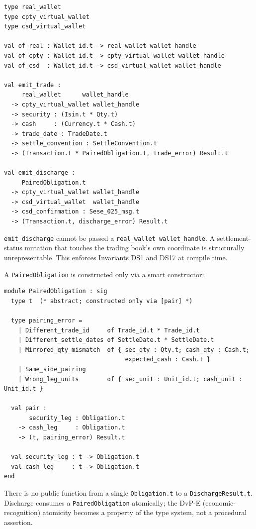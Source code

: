 \documentclass[11pt,a4paper]{article}
\begin{document}
\begin{lstlisting}
type real_wallet
type cpty_virtual_wallet
type csd_virtual_wallet

val of_real : Wallet_id.t -> real_wallet wallet_handle
val of_cpty : Wallet_id.t -> cpty_virtual_wallet wallet_handle
val of_csd  : Wallet_id.t -> csd_virtual_wallet wallet_handle

val emit_trade :
     real_wallet      wallet_handle
  -> cpty_virtual_wallet wallet_handle
  -> security : (Isin.t * Qty.t)
  -> cash     : (Currency.t * Cash.t)
  -> trade_date : TradeDate.t
  -> settle_convention : SettleConvention.t
  -> (Transaction.t * PairedObligation.t, trade_error) Result.t

val emit_discharge :
     PairedObligation.t
  -> cpty_virtual_wallet wallet_handle
  -> csd_virtual_wallet  wallet_handle
  -> csd_confirmation : Sese_025_msg.t
  -> (Transaction.t, discharge_error) Result.t
\end{lstlisting}

\texttt{emit\_discharge} cannot be passed a \texttt{real\_wallet wallet\_handle}. A settlement-status mutation that touches the trading book's $\mathrm{own}$ coordinate is structurally unrepresentable. This enforces Invariants DS1 and DS17 at compile time.

A \texttt{PairedObligation} is constructed only via a smart constructor:

\begin{lstlisting}
module PairedObligation : sig
  type t  (* abstract; constructed only via [pair] *)

  type pairing_error =
    | Different_trade_id     of Trade_id.t * Trade_id.t
    | Different_settle_dates of SettleDate.t * SettleDate.t
    | Mirrored_qty_mismatch  of { sec_qty : Qty.t; cash_qty : Cash.t;
                                  expected_cash : Cash.t }
    | Same_side_pairing
    | Wrong_leg_units        of { sec_unit : Unit_id.t; cash_unit : Unit_id.t }

  val pair :
       security_leg : Obligation.t
    -> cash_leg     : Obligation.t
    -> (t, pairing_error) Result.t

  val security_leg : t -> Obligation.t
  val cash_leg     : t -> Obligation.t
end
\end{lstlisting}

There is no public function from a single \texttt{Obligation.t} to a \texttt{DischargeResult.t}. Discharge consumes a \texttt{PairedObligation} atomically; the DvP-E (economic-recognition) atomicity becomes a property of the type system, not a procedural assertion.
\end{document}
